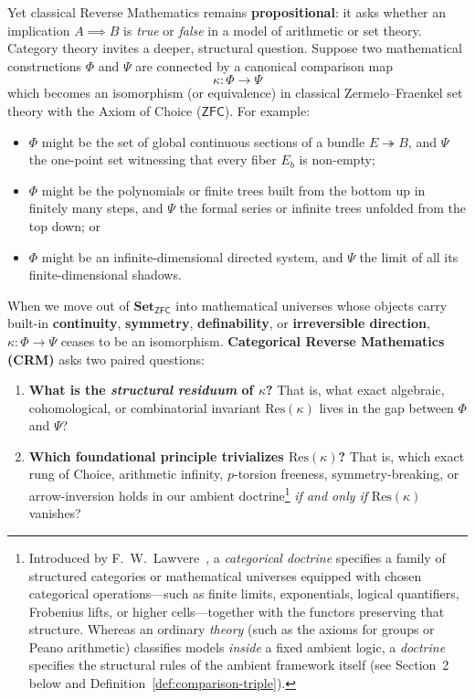 \documentclass[10pt,twoside,openright]{book}
\theoremstyle{crmplain}
\theoremstyle{crmdef}
\theoremstyle{crmremark}
\begin{document}
Yet classical Reverse Mathematics remains \textbf{propositional}: it asks whether an implication $A \implies B$ is \emph{true} or \emph{false} in a model of arithmetic or set theory. Category theory invites a deeper, structural question. Suppose two mathematical constructions $\Phi$ and $\Psi$ are connected by a canonical comparison map
\[
  \kappa : \Phi \longrightarrow \Psi
\]
which becomes an isomorphism (or equivalence) in classical Zermelo--Fraenkel set theory with the Axiom of Choice ($\mathsf{ZFC}$). For example:
\begin{itemize}
  \item $\Phi$ might be the set of global continuous sections of a bundle $E \twoheadrightarrow B$, and $\Psi$ the one-point set witnessing that every fiber $E_b$ is non-empty;
  \item $\Phi$ might be the polynomials or finite trees built from the bottom up in finitely many steps, and $\Psi$ the formal series or infinite trees unfolded from the top down; or
  \item $\Phi$ might be an infinite-dimensional directed system, and $\Psi$ the limit of all its finite-dimensional shadows.
\end{itemize}

When we move out of $\mathbf{Set}_{\mathsf{ZFC}}$ into mathematical universes whose objects carry built-in \textbf{continuity}, \textbf{symmetry}, \textbf{definability}, or \textbf{irreversible direction}, $\kappa : \Phi \to \Psi$ ceases to be an isomorphism. \textbf{Categorical Reverse Mathematics (CRM)} asks two paired questions:

\begin{enumerate}
  \item \textbf{What is the \emph{structural residuum} of $\kappa$?} That is, what exact algebraic, cohomological, or combinatorial invariant $\mathrm{Res}(\kappa)$ lives in the gap between $\Phi$ and $\Psi$?
  \item \textbf{Which foundational principle trivializes $\mathrm{Res}(\kappa)$?} That is, which exact rung of Choice, arithmetic infinity, $p$-torsion freeness, symmetry-breaking, or arrow-inversion holds in our ambient doctrine\footnote{Introduced by F.~W.~Lawvere~\cite{Lawvere69}, a \emph{categorical doctrine} specifies a family of structured categories or mathematical universes equipped with chosen categorical operations---such as finite limits, exponentials, logical quantifiers, Frobenius lifts, or higher cells---together with the functors preserving that structure. Whereas an ordinary \emph{theory} (such as the axioms for groups or Peano arithmetic) classifies models \emph{inside} a fixed ambient logic, a \emph{doctrine} specifies the structural rules of the ambient framework itself (see Section~2 below and Definition~\ref{def:comparison-triple}).} \emph{if and only if} $\mathrm{Res}(\kappa)$ vanishes?
\end{enumerate}
\end{document}
